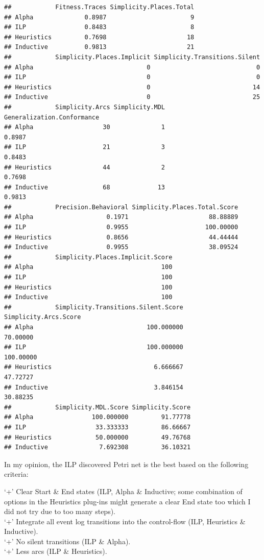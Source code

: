\documentclass[]{article}
\begin{document}
\begin{verbatim}
##            Fitness.Traces Simplicity.Places.Total
## Alpha              0.8987                       9
## ILP                0.8483                       8
## Heuristics         0.7698                      18
## Inductive          0.9813                      21
##            Simplicity.Places.Implicit Simplicity.Transitions.Silent
## Alpha                               0                             0
## ILP                                 0                             0
## Heuristics                          0                            14
## Inductive                           0                            25
##            Simplicity.Arcs Simplicity.MDL Generalization.Conformance
## Alpha                   30              1                     0.8987
## ILP                     21              3                     0.8483
## Heuristics              44              2                     0.7698
## Inductive               68             13                     0.9813
##            Precision.Behavioral Simplicity.Places.Total.Score
## Alpha                    0.1971                      88.88889
## ILP                      0.9955                     100.00000
## Heuristics               0.8656                      44.44444
## Inductive                0.9955                      38.09524
##            Simplicity.Places.Implicit.Score
## Alpha                                   100
## ILP                                     100
## Heuristics                              100
## Inductive                               100
##            Simplicity.Transitions.Silent.Score Simplicity.Arcs.Score
## Alpha                               100.000000              70.00000
## ILP                                 100.000000             100.00000
## Heuristics                            6.666667              47.72727
## Inductive                             3.846154              30.88235
##            Simplicity.MDL.Score Simplicity.Score
## Alpha                100.000000         91.77778
## ILP                   33.333333         86.66667
## Heuristics            50.000000         49.76768
## Inductive              7.692308         36.10321
\end{verbatim}

In my opinion, the ILP discovered Petri net is the best based on the
following criteria:

`+' Clear Start \& End states (ILP, Alpha \& Inductive; some combination
of options in the Heuristics plug-ins might generate a clear End state
too which I did not try due to too many steps).\\`+' Integrate all event
log transitions into the control-flow (ILP, Heuristics \&
Inductive).\\`+' No silent transitions (ILP \& Alpha).\\`+' Less arcs
(ILP \& Heuristics).
\end{document}
